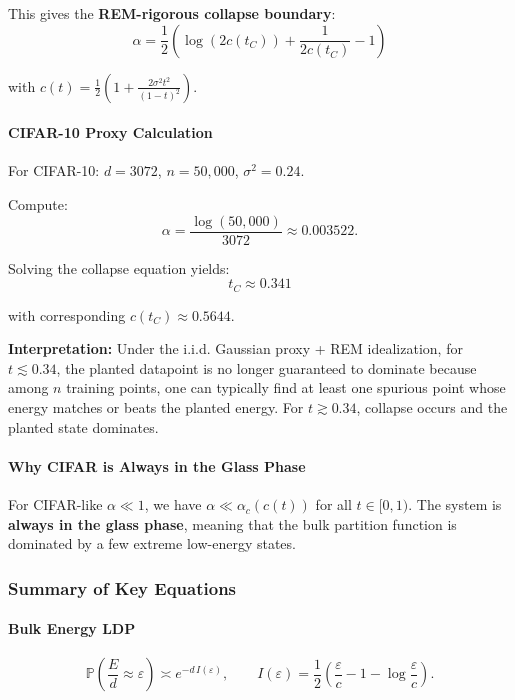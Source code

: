 \documentclass[11pt]{article}
\begin{document}
This gives the \textbf{REM-rigorous collapse boundary}:
\begin{equation}
\boxed{\alpha = \frac{1}{2}\left(\log(2c(t_C)) + \frac{1}{2c(t_C)} - 1\right)}
\end{equation}

with $c(t) = \frac{1}{2}\left(1 + \frac{2\sigma^2 t^2}{(1-t)^2}\right)$.

\paragraph{CIFAR-10 Proxy Calculation}
For CIFAR-10: $d = 3072$, $n = 50{,}000$, $\sigma^2 = 0.24$.

Compute:
\begin{equation}
\alpha = \frac{\log(50{,}000)}{3072} \approx 0.003522.
\end{equation}

Solving the collapse equation yields:
\begin{equation}
\boxed{t_C \approx 0.341}
\end{equation}

with corresponding $c(t_C) \approx 0.5644$.

\textbf{Interpretation:} Under the i.i.d. Gaussian proxy + REM idealization, for $t \lesssim 0.34$, the planted datapoint is no longer guaranteed to dominate because among $n$ training points, one can typically find at least one spurious point whose energy matches or beats the planted energy. For $t \gtrsim 0.34$, collapse occurs and the planted state dominates.

\paragraph{Why CIFAR is Always in the Glass Phase}
For CIFAR-like $\alpha \ll 1$, we have $\alpha \ll \alpha_c(c(t))$ for all $t \in [0,1)$. The system is \textbf{always in the glass phase}, meaning that the bulk partition function is dominated by a few extreme low-energy states.

\subsubsection{Summary of Key Equations}
\paragraph{Bulk Energy LDP}
\begin{equation}
\mathbb{P}\left(\frac{E}{d}\approx \varepsilon\right)\asymp e^{-d\,I(\varepsilon)},
\qquad
I(\varepsilon)=\frac{1}{2}\left(\frac{\varepsilon}{c}-1-\log\frac{\varepsilon}{c}\right).
\end{equation}
\end{document}
